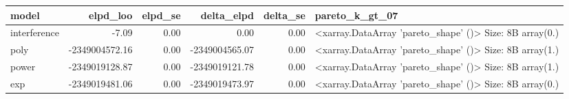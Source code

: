 \begin{tabular}{lrrrrl}
\toprule
model & elpd_loo & elpd_se & delta_elpd & delta_se & pareto_k_gt_07 \\
\midrule
interference & -7.09 & 0.00 & 0.00 & 0.00 & <xarray.DataArray 'pareto_shape' ()> Size: 8B
array(0.) \\
poly & -2349004572.16 & 0.00 & -2349004565.07 & 0.00 & <xarray.DataArray 'pareto_shape' ()> Size: 8B
array(1.) \\
power & -2349019128.87 & 0.00 & -2349019121.78 & 0.00 & <xarray.DataArray 'pareto_shape' ()> Size: 8B
array(1.) \\
exp & -2349019481.06 & 0.00 & -2349019473.97 & 0.00 & <xarray.DataArray 'pareto_shape' ()> Size: 8B
array(0.) \\
\bottomrule
\end{tabular}
